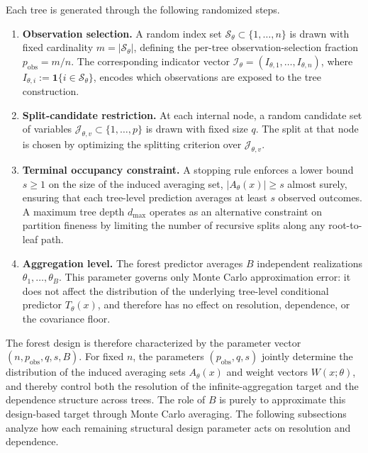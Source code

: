 \documentclass[11pt]{article}
\theoremstyle{plain}
\theoremstyle{definition}
\theoremstyle{remark}
\begin{document}
Each tree is generated through the following randomized steps.

\begin{enumerate}
	\item \textbf{Observation selection.}
	A random index set $\mathcal S_\theta \subset \{1,\dots,n\}$ is drawn with fixed cardinality $m = |\mathcal S_\theta|$, defining the per-tree observation-selection fraction $p_{\mathrm{obs}} = m/n$. The corresponding indicator vector $\mathcal I_\theta = (I_{\theta,1},\dots,I_{\theta,n})$, where $I_{\theta,i} := \mathbf 1\{ i \in \mathcal S_\theta \}$, encodes which observations are exposed to the tree construction.
	
	\item \textbf{Split-candidate restriction.}
	At each internal node, a random candidate set of variables $\mathcal J_{\theta,v} \subset \{1,\dots,p\}$ is drawn with fixed size $q$. The split at that node is chosen by optimizing the splitting criterion over $\mathcal J_{\theta,v}$.
	
	\item \textbf{Terminal occupancy constraint.}
	A stopping rule enforces a lower bound $s \ge 1$ on the size of the induced averaging set, $|A_\theta(x)| \ge s$ almost surely, ensuring that each tree-level prediction averages at least $s$ observed outcomes. A maximum tree depth $d_{\max}$ operates as an alternative constraint on partition fineness by limiting the number of recursive splits along any root-to-leaf path.
	
	\item \textbf{Aggregation level.}
	The forest predictor averages $B$ independent realizations $\theta_1,\dots,\theta_B$. This parameter governs only Monte Carlo approximation error: it does not affect the distribution of the underlying tree-level conditional predictor $T_\theta(x)$, and therefore has no effect on resolution, dependence, or the covariance floor.
\end{enumerate}

The forest design is therefore characterized by the parameter vector $(n, p_{\mathrm{obs}}, q, s, B)$. For fixed $n$, the parameters $(p_{\mathrm{obs}}, q, s)$ jointly determine the distribution of the induced averaging sets $A_\theta(x)$ and weight vectors $W(x;\theta)$, and thereby control both the resolution of the infinite-aggregation target and the dependence structure across trees. The role of $B$ is purely to approximate this design-based target through Monte Carlo averaging. The following subsections analyze how each remaining structural design parameter acts on resolution and dependence.
\end{document}
